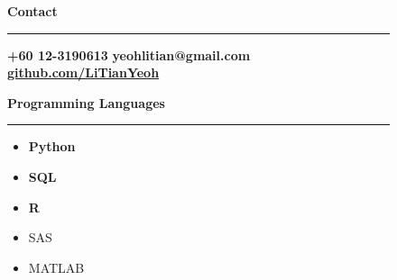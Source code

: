 \documentclass[a4paper, 10pt]{article}
\newcommand{\lhsWidth}{0.3\textwidth}
\begin{document}
\AddToShipoutPictureBG{
  \AtPageLowerLeft{%
    \color{lhsBgCol}%
    \rule{\dimexpr0.3\pdfpagewidth+0.2in}{\dimexpr\pdfpageheight}%
  }
}

\begin{figure}[h]

\color{white}
\begin{minipage}[t][\paperheight][t]{\lhsWidth}
	{\large \textbf{Contact}} \newline
	\rule [6pt]{\linewidth}{1pt}
	\vspace{-15pt}
	\newline \vspace{3pt}
	\faPhone \hspace{3pt} \textbf{+60 12-3190613}
	\newline \vspace{3pt}
	\faEnvelope \hspace{3pt} \textbf{yeohlitian@gmail.com}
	\newline \vspace{3pt}
	\faGithub \hspace{3pt} \textbf{\href{https://github.com/LiTianYeoh}{github.com/LiTianYeoh}}

	\vspace{3em}

	{\large \textbf{Programming Languages}}
	\newline
	\rule [6pt]{\linewidth}{1pt}	
	\vspace{-24pt}

	\begin{minipage}[t]{7em}
		\setlength{\leftmargini}{1em}
		
		\renewcommand{\labelitemi}{$\star$}
		\begin{itemize} [itemsep = 0pt, parsep=2pt]
			\item \textbf{Python}
			\item \textbf{SQL}
			\item \textbf{R}
		\end{itemize}
		\renewcommand{\labelitemi}{$\bullet$}

	\end{minipage}
	\hspace{0.5em}
	\begin{minipage}[t]{7em}
		\setlength{\leftmargini}{1em}
	
		\begin{itemize} [itemsep = 0pt, parsep=2pt]
			\item SAS
			\item MATLAB
		\end{itemize}


\end{minipage}
\end{minipage}
\end{figure}
\end{document}
